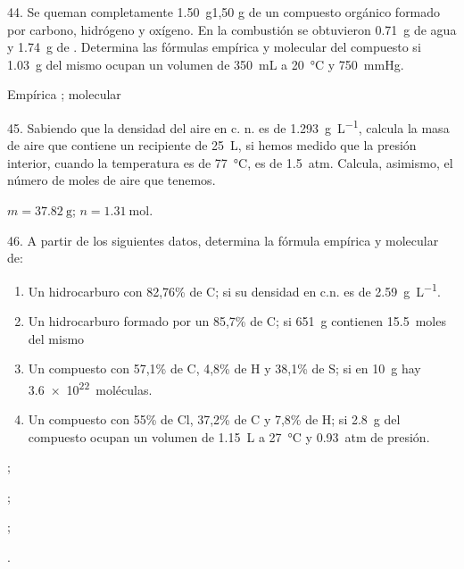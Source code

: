 \documentclass[11pt]{article}
\begin{document}
\begin{multicols}{2}
\begin{exercise}
  44. Se queman completamente \SI{1.50}{\gram}1,50 g de un compuesto orgánico
  formado por carbono, hidrógeno y oxígeno. En la combustión
  se obtuvieron \SI{0.71}{\gram} de agua y \SI{1.74}{\gram} de . Determina las fórmulas empírica y molecular del compuesto si
  \SI{1.03}{\gram} del mismo ocupan un volumen de \SI{350}{\milli\liter} a \SI{20}{\celsius} y \SI{750}{\mmHg}.
\end{exercise}
\begin{solution}
  Empírica ; molecular 
\end{solution}

\begin{exercise}
  45. Sabiendo que la densidad del aire en c. n. es de \SI{1.293}{\gram\per\liter}, calcula la masa de aire que contiene un recipiente de \SI{25}{\liter}, si
  hemos medido que la presión interior, cuando la temperatura
  es de \SI{77}{\celsius}, es de \SI{1.5}{atm}. Calcula, asimismo, el número de
  moles de aire que tenemos.
\end{exercise}
\begin{solution}
  $m = \SI{37.82}{\gram}$; $n = \SI{1.31}{\mole}$.
\end{solution}

\begin{exercise}
46. A partir de los siguientes datos, determina la fórmula empírica y molecular de:
\begin{enumerate}
  \item Un hidrocarburo con 82,76\% de C; si su densidad en c.n. es de \SI{2.59}{\gram\per\liter}.
  \item Un hidrocarburo formado por un 85,7\% de C; si \SI{651}{\gram} contienen \SI{15.5}{moles} del mismo
  \item Un compuesto con 57,1\% de C, 4,8\% de H y 38,1\% de S; si en \SI{10}{\gram} hay \SI{3.6e22}{moléculas}.
  \item Un compuesto con 55\% de Cl, 37,2\% de C y 7,8\% de H; si \SI{2.8}{\gram} del compuesto ocupan un volumen de \SI{1.15}{\liter} a \SI{27}{\celsius} y \SI{0.93}{atm} de presión.
\end{enumerate}
\end{exercise}
\begin{solution}
  \begin{enumerate*}
    \item {};
    \item {};
    \item {};
    \item {}.
  \end{enumerate*}
\end{solution}


\end{multicols}
\end{document}
